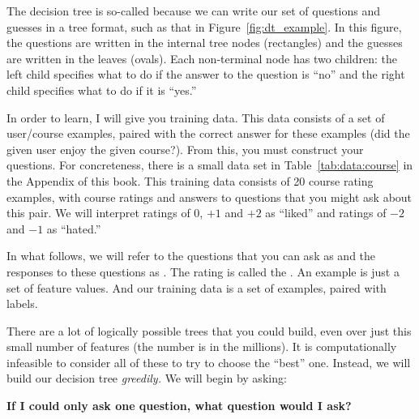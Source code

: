 \MoveNextFigure{-8cm}

The decision tree is so-called because we can write our set of
questions and guesses in a tree format, such as that in
Figure~\ref{fig:dt_example}.  In this figure, the questions are
written in the internal tree nodes (rectangles) and the guesses are
written in the leaves (ovals).  Each non-terminal node has two
children: the left child specifies what to do if the answer to the
question is ``no'' and the right child specifies what to do if it is
``yes.''

In order to learn, I will give you training data.  This data consists
of a set of user/course examples, paired with the correct answer for
these examples (did the given user enjoy the given course?).  From
this, you must construct your questions.  For concreteness, there is a
small data set in Table~\ref{tab:data:course} in the Appendix of this
book.  This training data consists of 20 course rating examples, with
course ratings and answers to questions that you might ask about this
pair.  We will interpret ratings of $0$, $+1$ and $+2$ as ``liked'' and
ratings of $-2$ and $-1$ as ``hated.''

In what follows, we will refer to the questions that you can ask as
 and the responses to these questions as
.  The rating is called the .
An example is just a set of feature values.  And our training data is
a set of examples, paired with labels.

There are a lot of logically possible trees that you could build, even
over just this small number of features (the number is in the
millions).  It is computationally infeasible to consider all of these
to try to choose the ``best'' one.  Instead, we will build our
decision tree \emph{greedily.}  We will begin by asking:

{\bf If I could only ask one question, what question would I ask?}


\MoveNextFigure{-10cm}

